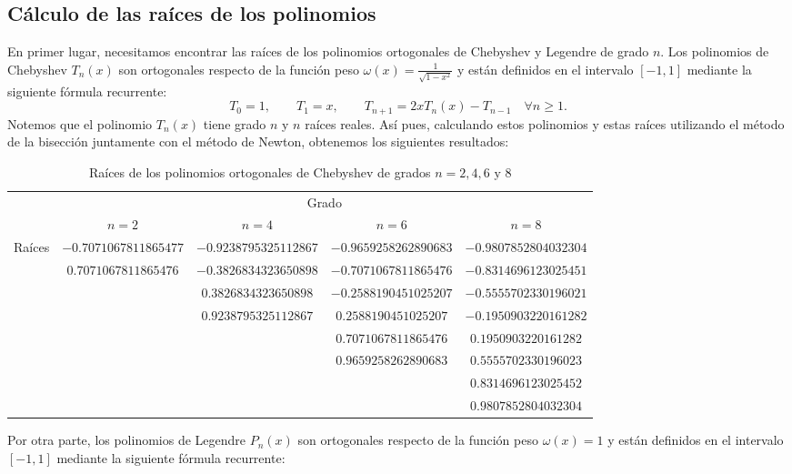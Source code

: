 \documentclass[a4paper]{article}
\begin{document}
\subsection*{Cálculo de las raíces de los polinomios}
En primer lugar, necesitamos encontrar las raíces de los polinomios ortogonales de Chebyshev y Legendre de grado $n$. Los polinomios de Chebyshev $T_n(x)$ son ortogonales respecto de la función peso $\omega(x)=\frac{1}{\sqrt{1-x^2}}$ y están definidos en el intervalo $[-1,1]$ mediante la siguiente fórmula recurrente:
$$T_0=1,\qquad T_1=x,\qquad T_{n+1}=2xT_n(x)-T_{n-1}\quad\forall n\geq 1.$$ Notemos que el polinomio $T_n(x)$ tiene grado $n$ y $n$ raíces reales. Así pues, calculando estos polinomios y estas raíces utilizando el método de la bisección juntamente con el método de Newton, obtenemos los siguientes resultados:
\begin{table}[ht]
    \centering
    \begin{tabular}{|c|c|c|c|c|}
        \cline{2-5}
        \multicolumn{1}{c|}{} & \multicolumn{4}{c|}{Grado}\\
        \cline{2-5}
        \multicolumn{1}{c|}{} & $n=2$ & $n=4$ & $n=6$ & $n=8$ \\
        \hline
        \multirow{8}{*}{Raíces} & $-0.7071067811865477$ & $-0.9238795325112867$ & $-0.9659258262890683$ & $-0.9807852804032304$ \\
        & $0.7071067811865476$ & $-0.3826834323650898$ & $-0.7071067811865476$ & $-0.8314696123025451$ \\
        & & $0.3826834323650898$ & $-0.2588190451025207$ & $-0.5555702330196021$ \\
        & & $0.9238795325112867$ & $0.2588190451025207$ & $-0.1950903220161282$ \\
        & & & $0.7071067811865476$ & $0.1950903220161282$ \\
        & & & $0.9659258262890683$ & $0.5555702330196023$ \\
        & & & & $0.8314696123025452$ \\
        & & & & $0.9807852804032304$ \\
        \hline
    \end{tabular}
    \caption{Raíces de los polinomios ortogonales de Chebyshev de grados $n=2,4,6\text{ y }8$}
\end{table}\par
Por otra parte, los polinomios de Legendre $P_n(x)$ son ortogonales respecto de la función peso $\omega(x)=1$ y están definidos en el intervalo $[-1,1]$ mediante la siguiente fórmula recurrente:
\end{document}

